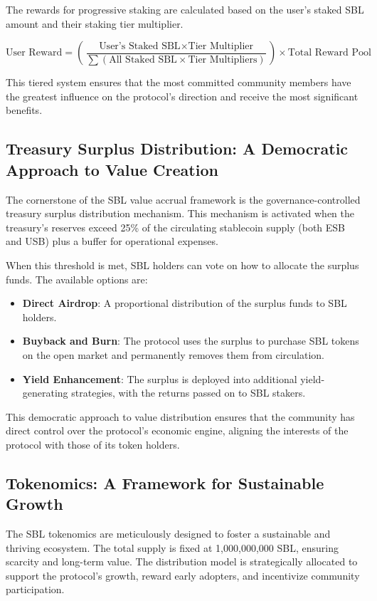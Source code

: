 The rewards for progressive staking are calculated based on the user's staked SBL amount and their staking tier multiplier.

\begin{equation}
\text{User Reward} = (\frac{\text{User's Staked SBL} \times \text{Tier Multiplier}}{\sum (\text{All Staked SBL} \times \text{Tier Multipliers})}) \times \text{Total Reward Pool}
\end{equation}

This tiered system ensures that the most committed community members have the greatest influence on the protocol's direction and receive the most significant benefits.

\subsection{Treasury Surplus Distribution: A Democratic Approach to Value Creation}
The cornerstone of the SBL value accrual framework is the governance-controlled treasury surplus distribution mechanism. This mechanism is activated when the treasury's reserves exceed 25\% of the circulating stablecoin supply (both ESB and USB) plus a buffer for operational expenses.

When this threshold is met, SBL holders can vote on how to allocate the surplus funds. The available options are:

\begin{itemize}
    \item \textbf{Direct Airdrop}: A proportional distribution of the surplus funds to SBL holders.
    \item \textbf{Buyback and Burn}: The protocol uses the surplus to purchase SBL tokens on the open market and permanently removes them from circulation.
    \item \textbf{Yield Enhancement}: The surplus is deployed into additional yield-generating strategies, with the returns passed on to SBL stakers.
\end{itemize}

This democratic approach to value distribution ensures that the community has direct control over the protocol's economic engine, aligning the interests of the protocol with those of its token holders.

\subsection{Tokenomics: A Framework for Sustainable Growth}
The SBL tokenomics are meticulously designed to foster a sustainable and thriving ecosystem. The total supply is fixed at 1,000,000,000 SBL, ensuring scarcity and long-term value. The distribution model is strategically allocated to support the protocol's growth, reward early adopters, and incentivize community participation.

